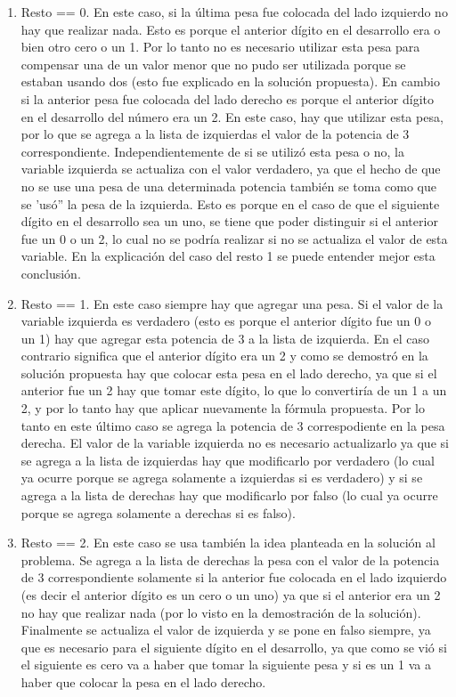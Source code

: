 	\begin{enumerate}
		\item{
			Resto == 0. En este caso, si la última pesa fue colocada del lado izquierdo no hay que realizar nada. Esto es porque el anterior dígito en el desarrollo era o bien otro cero o un 1. Por lo tanto no es necesario utilizar esta pesa para compensar una de un valor menor que no pudo ser utilizada porque se estaban usando dos (esto fue explicado en la solución propuesta). En cambio si la anterior pesa fue colocada del lado derecho es porque el anterior dígito en el desarrollo del número era un 2. En este caso, hay que utilizar esta pesa, por lo que se agrega a la lista de izquierdas el valor de la potencia de 3 correspondiente. Independientemente de si se utilizó esta pesa o no, la variable izquierda se actualiza con el valor verdadero, ya que el hecho de que no se use una pesa de una determinada potencia también se toma como que se 'usó'' la pesa de la izquierda. Esto es porque en el caso de que el siguiente dígito en el desarrollo sea un uno, se tiene que poder distinguir si el anterior fue un 0 o un 2, lo cual no se podría realizar si no se actualiza el valor de esta variable. En la explicación del caso del resto 1 se puede entender mejor esta conclusión. 
		}
		\item{
			Resto == 1. En este caso siempre hay que agregar una pesa. Si el valor de la variable izquierda es verdadero (esto es porque el anterior dígito fue un 0 o un 1) hay que agregar esta potencia de 3 a la lista de izquierda. En el caso contrario significa que el anterior dígito era un 2 y como se demostró en la solución propuesta hay que colocar esta pesa en el lado derecho, ya que si el anterior fue un 2 hay que tomar este dígito, lo que lo convertiría de un 1 a un 2, y por lo tanto hay que aplicar nuevamente la fórmula propuesta. Por lo tanto en este último caso se agrega la potencia de 3 correspodiente en la pesa derecha. El valor de la variable izquierda no es necesario actualizarlo ya que si se agrega a la lista de izquierdas hay que modificarlo por verdadero (lo cual ya ocurre porque se agrega solamente a izquierdas si es verdadero) y si se agrega a la lista de derechas hay que modificarlo por falso (lo cual ya ocurre porque se agrega solamente a derechas si es falso).
		}
		\item{
			Resto == 2. En este caso se usa también la idea planteada en la solución al problema. Se agrega a la lista de derechas la pesa con el valor de la potencia de 3 correspondiente solamente si la anterior fue colocada en el lado izquierdo (es decir el anterior dígito es un cero o un uno) ya que si el anterior era un 2 no hay que realizar nada (por lo visto en la demostración de la solución). Finalmente se actualiza el valor de izquierda y se pone en falso siempre, ya que es necesario para el siguiente dígito en el desarrollo, ya que como se vió si el siguiente es cero va a haber que tomar la siguiente pesa y si es un 1 va a haber que colocar la pesa en el lado derecho.	
		}
	\end{enumerate}

